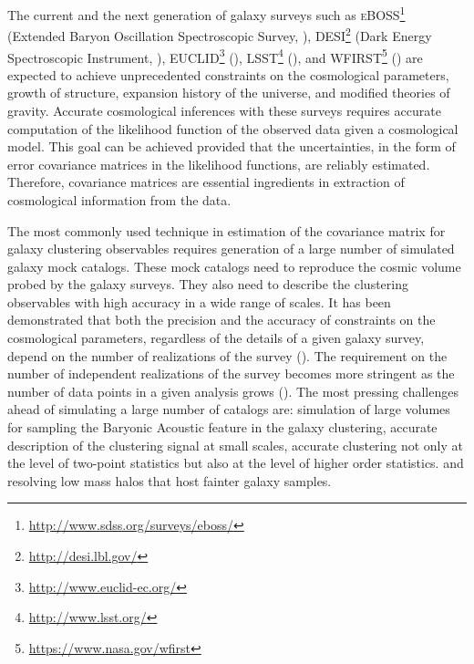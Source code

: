 \documentclass[english,usenatbib]{mn2e}
\begin{document}
The current and the next generation of galaxy surveys such as \textsc{eBOSS}\footnote{\url{http://www.sdss.org/surveys/eboss/}} (Extended Baryon Oscillation Spectroscopic Survey, \citealt{eBOSS}), \textsc{DESI}\footnote{\url{http://desi.lbl.gov/}} (Dark Energy Spectroscopic Instrument, \citealt{desi}), \textsc{EUCLID}\footnote{\url{http://www.euclid-ec.org/}} (\citealt{euclid}), \textsc{LSST}\footnote{\url{http://www.lsst.org/}} (\citealt{lsst}), and \textsc{WFIRST}\footnote{\url{https://www.nasa.gov/wfirst}} (\citealt{wfirst}) are expected to achieve unprecedented constraints on the cosmological parameters, growth of structure, expansion history of the universe, and modified theories of gravity. Accurate cosmological inferences with these surveys requires accurate computation of the likelihood function of the observed data given a cosmological model. This goal can be achieved provided that the uncertainties, in the form of error covariance matrices in the likelihood functions, are reliably estimated. Therefore, covariance matrices are essential ingredients in extraction of cosmological information from the data.

The most commonly used technique in estimation of the covariance matrix for galaxy clustering observables requires generation of a large number of simulated galaxy mock catalogs. These mock catalogs need to reproduce the cosmic volume probed by the galaxy surveys. They also need to describe the clustering observables with high accuracy in a wide range of scales. It has been demonstrated that both the precision and the accuracy of constraints on the cosmological parameters, regardless of the details of a given galaxy survey, depend on the number of realizations of the survey (\citealt{dodelson2013,taylor2014}). The requirement on the number of independent realizations of the survey becomes more stringent as the number of data points in a given analysis grows (\citealt{taylor2013}).
The most pressing challenges ahead of simulating a large number of catalogs are: simulation of large volumes for sampling the Baryonic Acoustic feature in the galaxy clustering, accurate description of the clustering signal at small scales, accurate clustering not only at the level of two-point statistics but also at the level of higher order statistics.  and resolving low mass halos that host fainter galaxy samples.  
\end{document}

